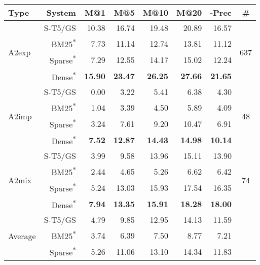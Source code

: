 \documentclass[11pt]{article}
\begin{document}
\begin{table*}[]
    \centering
    \begin{tabular}{l|r|r|r|r|r|r|c}
     Type &  System &  M@1 &  M@5 &  M@10 &  M@20 &  -Prec &  \# \\
    \hline
    \hline
    \multirow{4}{2em}{A2exp} &    S-T5/GS &  10.38 &  16.74 &   19.48 &   20.89 &        16.57 &      \multirow{4}{2em}{637} \\
     &    BM25\textsuperscript{*} &   7.73 &  11.14 &   12.74 &   13.81 &        11.12 &       \\
     &    Sparse\textsuperscript{*} &   7.29 &  12.55 &   14.17 &   15.02 &        12.24 &       \\
     &    Dense\textsuperscript{*} &  \textbf{15.90} &  \textbf{23.47} &   \textbf{26.25} &   \textbf{27.66} &        \textbf{21.65} &       \\
    \hline
    \multirow{4}{2em}{A2imp} &    S-T5/GS &   0.00 &   3.22 &    5.41 &    6.38 &         4.30 &       \multirow{4}{2em}{48} \\
     &    BM25\textsuperscript{*} &   1.04 &   3.39 &    4.50 &    5.89 &         4.09 &        \\
     &    Sparse\textsuperscript{*} &   3.24 &   7.61 &    9.20 &   10.47 &         6.91 &        \\
     &    Dense\textsuperscript{*} &   \textbf{7.52} &  \textbf{12.87} &   \textbf{14.43} &   \textbf{14.98} &        \textbf{10.14} &        \\
    \hline
    \multirow{4}{3em}{A2mix} &    S-T5/GS &   3.99 &   9.58 &   13.96 &   15.11 &        13.90 &       \multirow{4}{2em}{74} \\
     &    BM25\textsuperscript{*} &   2.44 &   4.65 &    5.26 &    6.62 &         6.42 &        \\
     &    Sparse\textsuperscript{*} &   5.24 &  13.03 &   15.93 &   17.54 &        16.35 &        \\
     &    Dense\textsuperscript{*} &   \textbf{7.94} &  \textbf{13.35} &   \textbf{15.91} &   \textbf{18.28} &        \textbf{18.00} &        \\
    \hline
    \hline
     \multirow{4}{2em}{Average} &    S-T5/GS &   4.79 &   9.85 &   12.95 &   14.13 &        11.59 &         \\
      &    BM25\textsuperscript{*} &   3.74 &   6.39 &    7.50 &    8.77 &         7.21 &          \\
      &    Sparse\textsuperscript{*} &   5.26 &  11.06 &   13.10 &   14.34 &        11.83 &         \\

\end{tabular}
\end{table*}
\end{document}
